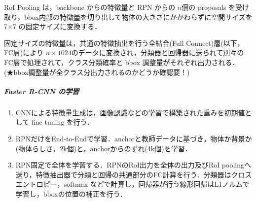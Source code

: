 \documentclass[twocolumn]{jsarticle} %
\begin{document}
RoI Pooling は，backbone からの特徴量と RPN からの $n$個の proposals を受け取り，bbox内部の特徴量を切り出して物体の大きさにかかわらずに空間サイズを 7{$\times$}7 の固定サイズに変換する．

固定サイズの特徴量は，共通の特徴抽出を行う全結合(Full Connect)層(以下，FC層)により $n{\times}1024$のデータに変換され，分類器と回帰器に送られて別々のFC層で処理されて，クラス分類確率と bbox 調整量がそれぞれ出力される．(★bbox調整量が全クラス分出力されるのかどうか確認要！)

\subparagraph{Faster R-CNN の学習} 
\begin{enumerate}
    \item CNNによる特徴量生成は，画像認識などの学習で構築された重みを初期値として fine tuning を行う．
    \item RPNだけをEnd-to-Endで学習．anchorと教師データに基づき，物体か背景か(物体らしさ，2k個)と，anchorからのずれ(4k個)を学習．
    \item RPN固定で全体を学習する．RPNのRoI出力を全体の出力及びRoI poolingへ送り，特徴抽出器で分類と回帰の共通部分のFC計算を行う．分類器はクロスエントロピー，softmax などで計算し，回帰器が行う線形回帰はL1ノルムで学習し，bboxの位置の補正を行う．
\end{enumerate}

\end{document}
